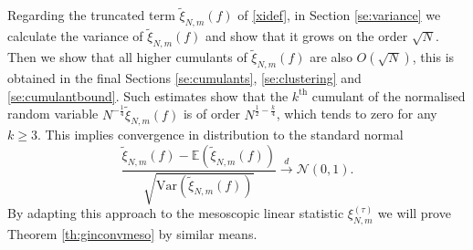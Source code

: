 \documentclass[11pt,reqno]{amsproc}
\numberwithin{equation}{section}
\numberwithin{theorem}{section}
\begin{document}
Regarding the truncated term $\tilde{\xi}_{N,m}(f)$ of \eqref{xidef}, in Section \ref{se:variance} we calculate the variance of $\tilde{\xi}_{N,m}(f)$ and show that it grows on the order $\sqrt{N}$. Then we show that all higher cumulants of $\tilde{\xi}_{N,m}(f)$ are also $O(\sqrt{N})$, this is obtained in the final Sections 
\ref{se:cumulants}, \ref{se:clustering} and \ref{se:cumulantbound}. Such estimates show that the $k^{\mathrm{th}}$ cumulant of the normalised random variable $N^{-\frac{1}{4}}\tilde{\xi}_{N,m}(f)$ is of order $N^{\frac{1}{2}-\frac{k}{4}}$, which tends to zero for any $k\geq 3$. This implies convergence in distribution to the standard normal
\begin{equation}
\frac{\tilde{\xi}_{N,m}(f)-\mathbb{E}(\tilde{\xi}_{N,m}(f))}{\sqrt{\mathrm{Var}(\tilde{\xi}_{N,m}(f))}} \overset{d}{\longrightarrow} \mathcal{N}(0,1).
\end{equation}
By adapting this approach to the mesoscopic linear statistic $\xi^{(\tau)}_{N,m}$ we will prove Theorem \ref{th:ginconvmeso} by similar means.%
\end{document}
